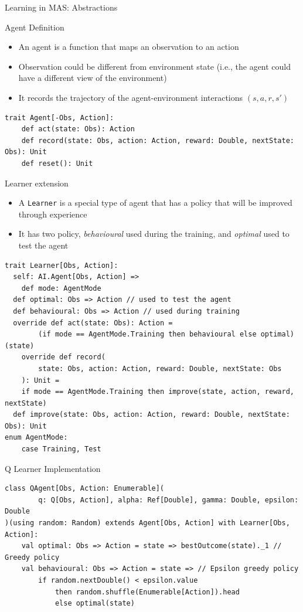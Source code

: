 \documentclass[presentation, 8pt]{beamer}\mode<presentation>{\usetheme{AMSBolognaFC}}
\begin{document}
\begin{frame}{Learning in MAS: Abstractions}
\begin{exampleblock}{Agent Definition}
	\begin{itemize}
		\item An agent is a function that maps an observation to an action
		\item Observation could be different from environment state (i.e., the agent could have a different view of the environment)
		\item It records the trajectory of the agent-environment interactions $(s, a, r, s')$ 
	\end{itemize}
\begin{lstlisting}[style=scala]
trait Agent[-Obs, Action]:
	def act(state: Obs): Action
	def record(state: Obs, action: Action, reward: Double, nextState: Obs): Unit 
	def reset(): Unit
\end{lstlisting}
\end{exampleblock}
\begin{exampleblock}{Learner extension}
\begin{itemize}
	\item A \lstinline[style=scala]{Learner} is a special type of agent that has a policy that will be improved through experience
	\item It has two policy, \emph{behavioural} used during the training, and \emph{optimal} used to test the agent
\end{itemize}
\begin{lstlisting}[style=scala]
trait Learner[Obs, Action]:
  self: AI.Agent[Obs, Action] =>
	def mode: AgentMode
  def optimal: Obs => Action // used to test the agent
  def behavioural: Obs => Action // used during training
  override def act(state: Obs): Action = 
		(if mode == AgentMode.Training then behavioural else optimal) (state)
	override def record(
		state: Obs, action: Action, reward: Double, nextState: Obs
	): Unit =
    if mode == AgentMode.Training then improve(state, action, reward, nextState)
  def improve(state: Obs, action: Action, reward: Double, nextState: Obs): Unit
enum AgentMode:
	case Training, Test
\end{lstlisting}
\end{exampleblock}
\framebreak
\begin{exampleblock}{Q Learner Implementation}
	\begin{lstlisting}[style=scala]
class QAgent[Obs, Action: Enumerable](
		q: Q[Obs, Action], alpha: Ref[Double], gamma: Double, epsilon: Double
)(using random: Random) extends Agent[Obs, Action] with Learner[Obs, Action]:
	val optimal: Obs => Action = state => bestOutcome(state)._1 // Greedy policy
	val behavioural: Obs => Action = state => // Epsilon greedy policy
		if random.nextDouble() < epsilon.value 
			then random.shuffle(Enumerable[Action]).head
			else optimal(state)


\end{lstlisting}
\end{exampleblock}
\end{frame}
\end{document}
